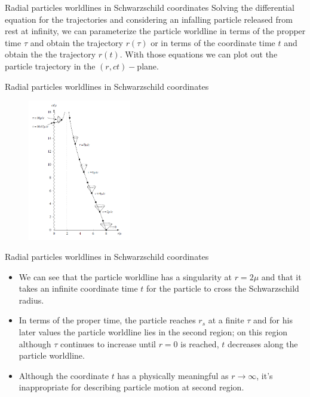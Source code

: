 \documentclass[xcolor=dvipsnames]{beamer}
\begin{document}
\begin{frame}{Radial particles worldlines in Schwarzschild coordinates}
Solving the differential equation for the trajectories and considering an infalling particle released from rest at infinity, we can parameterize the particle worldline in terms of the propper time $\tau$ and obtain the trajectory $r(\tau)$ or in terms of the coordinate time $t$ and obtain the the trajectory $r(t)$.  With those equations we can plot out the particle trajectory in the $(r,ct)-$plane.
    
    
\end{frame}

\begin{frame}{Radial particles worldlines in Schwarzschild coordinates}
    
    
\begin{figure}
    \centering
    \includegraphics[width=0.4\textwidth]{Presentations/Images/4_bhparticles.png}
\end{figure}
\end{frame}

\begin{frame}{Radial particles worldlines in Schwarzschild coordinates}
\begin{itemize}
    \item We can see that the particle worldline has a singularity at $r=2\mu$ and that it takes an infinite coordinate time $t$ for the particle
to cross the Schwarzschild radius.
\item In terms of the proper time, the particle reaches $r_s$ at a finite $\tau$ and for his later values the particle worldline lies in the second region; on this region although $\tau$ continues to increase until $r=0$ is reached,  $t$ decreases along the particle worldline. 
\item Although the coordinate $t$ has a physically meaningful as $r\rightarrow \infty$, it's inappropriate for describing particle motion at second region.

\end{itemize}

\end{frame}
\end{document}
